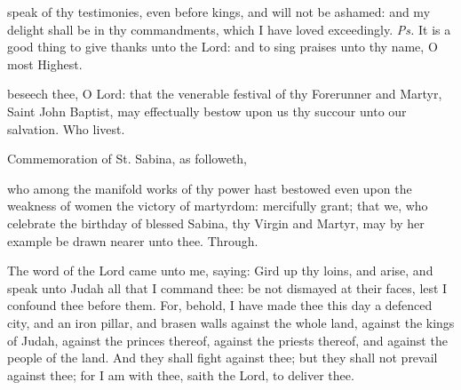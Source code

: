 \introit
{} speak of thy testimonies, even before kings, and will not be ashamed: and my delight shall be in thy commandments, which I have loved exceedingly. \textit{Ps.} It is a good thing to give thanks unto the Lord: and to sing praises unto thy name, O most Highest.

\collect
{} beseech thee, O Lord: that the venerable festival of thy Forerunner and Martyr, Saint John Baptist, may effectually bestow upon us thy succour unto our salvation. Who livest.

\begin{rubric}
	 Commemoration of St. Sabina, as followeth,
\end{rubric}
 who among the manifold works of thy power hast bestowed even upon the weakness of women the victory of martyrdom: mercifully grant; that we, who celebrate the birthday of blessed Sabina, thy Virgin and Martyr, may by her example be drawn nearer unto thee. Through.

 The word of the Lord came unto me, saying: Gird up thy loins, and arise, and speak unto Judah all that I command thee: be not dismayed at their faces, lest I confound thee before them. For, behold, I have made thee this day a defenced city, and an iron pillar, and brasen walls against the whole land, against the kings of Judah, against the princes thereof, against the priests thereof, and against the people of the land. And they shall fight against thee; but they shall not prevail against thee; for I am with thee, saith the Lord, to deliver thee.


